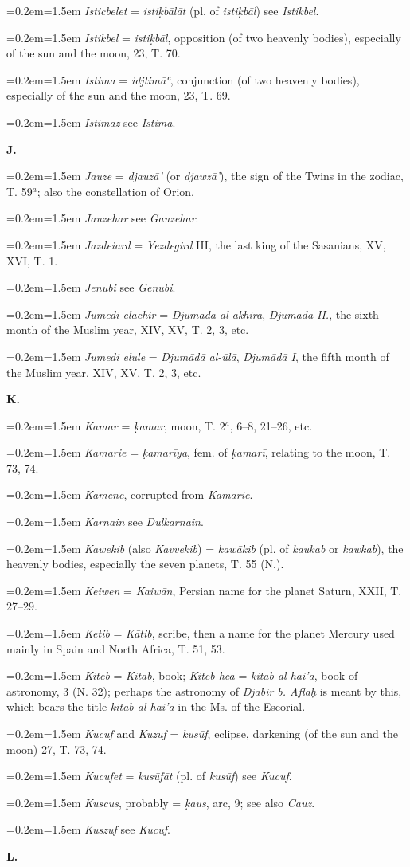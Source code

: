 \documentclass[11pt]{article}
\newcommand{\Pg}[1]{\marginpar{\footnotesize\color{gray}#1}}
\newcommand{\Entry}[1]{\par{\parskip=0.2em\relax\noindent\hangindent=1.5em\hangafter=1 #1\par}}
\begin{document}
\Entry{\emph{Isticbelet} = \emph{istiḳbālāt} (pl. of \emph{istiḳbāl}) see \emph{Istikbel}.}
\Entry{\emph{Istikbel} = \emph{istiḳbāl}, opposition (of two heavenly bodies), especially of the sun and the moon, 23, T. 70.}
\Entry{\emph{Istima} = \emph{idjtimāʿ}, conjunction (of two heavenly bodies), especially of the sun and the moon, 23, T. 69.}
\Entry{\emph{Istimaz} see \emph{Istima}.}
\par\begin{center}\textbf{J.}\end{center}
\Entry{\emph{Jauze} = \emph{djauzā’} (or \emph{djawzā’}), the sign of the Twins in the zodiac, T. 59$^{a}$; also the constellation of Orion.}
\Entry{\emph{Jauzehar} see \emph{Gauzehar}.}
\Entry{\emph{Jazdeiard} = \emph{Yezdegird} III, the last king of the Sasanians, XV, XVI, T. 1.}
\Entry{\emph{Jenubi} see \emph{Genubi}.}
\Entry{\emph{Jumedi elachir} = \emph{Djumādā al-ākhira}, \emph{Djumādā II.}, the sixth month of the Muslim year, XIV, XV, T. 2, 3, etc.}
\Entry{\emph{Jumedi elule} = \emph{Djumādā al-ūlā}, \emph{Djumādā I}, the fifth month of the Muslim year, XIV, XV, T. 2, 3, etc.}
\par\begin{center}\Pg{244}\textbf{K.}\end{center}
\Entry{\emph{Kamar} = \emph{ḳamar}, moon, T. 2$^{a}$, 6–8, 21–26, etc.}
\Entry{\emph{Kamarie} = \emph{ḳamarīya}, fem. of \emph{ḳamarī}, relating to the moon, T. 73, 74.}
\Entry{\emph{Kamene}, corrupted from \emph{Kamarie}.}
\Entry{\emph{Karnain} see \emph{Dulkarnain}.}
\Entry{\emph{Kawekib} (also \emph{Kavvekib}) = \emph{kawākib} (pl. of \emph{kaukab} or \emph{kawkab}), the heavenly bodies, especially the seven planets, T. 55 (N.).}
\Entry{\emph{Keiwen} = \emph{Kaiwān}, Persian name for the planet Saturn, XXII, T. 27–29.}
\Entry{\emph{Ketib} = \emph{Kātib}, scribe, then a name for the planet Mercury used mainly in Spain and North Africa, T. 51, 53.}
\Entry{\emph{Kiteb} = \emph{Kitāb}, book; \emph{Kiteb hea} = \emph{kitāb al-hai’a}, book of astronomy, 3 (N. 32); perhaps the astronomy of \emph{Djābir b. Aflaḥ} is meant by this, which bears the title \emph{kitāb al-hai’a} in the Ms. of the Escorial.}
\Entry{\emph{Kucuf} and \emph{Kuzuf} = \emph{kusūf}, eclipse, darkening (of the sun and the moon) 27, T. 73, 74.}
\Entry{\emph{Kucufet} = \emph{kusūfāt} (pl. of \emph{kusūf}) see \emph{Kucuf}.}
\Entry{\emph{Kuscus}, probably = \emph{ḳaus}, arc, 9; see also \emph{Cauz}.}
\Entry{\emph{Kuszuf} see \emph{Kucuf}.}
\par\begin{center}\textbf{L.}\end{center}
\end{document}
